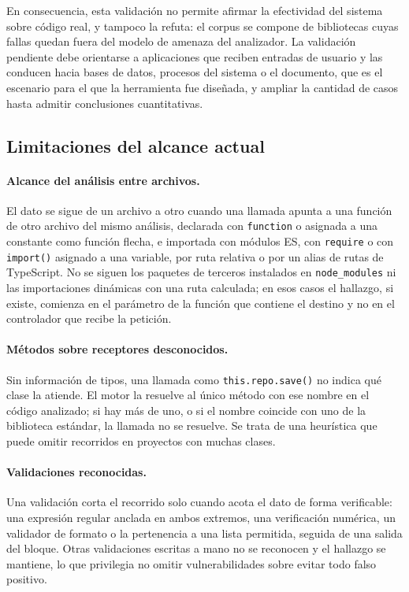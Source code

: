 En consecuencia, esta validación no permite afirmar la efectividad del sistema sobre código real, y tampoco la refuta: el corpus se compone de bibliotecas cuyas fallas quedan fuera del modelo de amenaza del analizador. La validación pendiente debe orientarse a aplicaciones que reciben entradas de usuario y las conducen hacia bases de datos, procesos del sistema o el documento, que es el escenario para el que la herramienta fue diseñada, y ampliar la cantidad de casos hasta admitir conclusiones cuantitativas.

\subsection{Limitaciones del alcance actual}\label{sec:n4.2.5}

\paragraph{Alcance del análisis entre archivos.} El dato se sigue de un archivo a otro cuando una llamada apunta a una función de otro archivo del mismo análisis, declarada con \texttt{function} o asignada a una constante como función flecha, e importada con módulos ES, con \texttt{require} o con \texttt{import()} asignado a una variable, por ruta relativa o por un alias de rutas de TypeScript. No se siguen los paquetes de terceros instalados en \texttt{node\_modules} ni las importaciones dinámicas con una ruta calculada; en esos casos el hallazgo, si existe, comienza en el parámetro de la función que contiene el destino y no en el controlador que recibe la petición.

\paragraph{Métodos sobre receptores desconocidos.} Sin información de tipos, una llamada como \texttt{this.repo.save()} no indica qué clase la atiende. El motor la resuelve al único método con ese nombre en el código analizado; si hay más de uno, o si el nombre coincide con uno de la biblioteca estándar, la llamada no se resuelve. Se trata de una heurística que puede omitir recorridos en proyectos con muchas clases.

\paragraph{Validaciones reconocidas.} Una validación corta el recorrido solo cuando acota el dato de forma verificable: una expresión regular anclada en ambos extremos, una verificación numérica, un validador de formato o la pertenencia a una lista permitida, seguida de una salida del bloque. Otras validaciones escritas a mano no se reconocen y el hallazgo se mantiene, lo que privilegia no omitir vulnerabilidades sobre evitar todo falso positivo.

